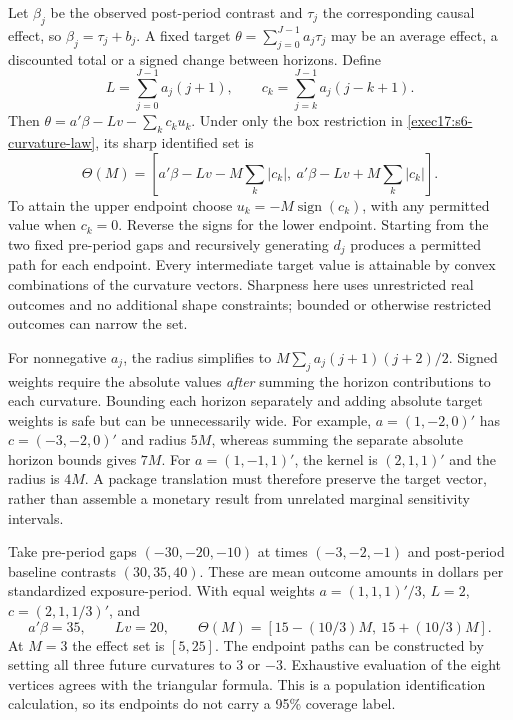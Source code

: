 Let $\beta_j$ be the observed post-period contrast and $\tau_j$ the
corresponding causal effect, so $\beta_j=\tau_j+b_j$. A fixed target
$\theta=\sum_{j=0}^{J-1}a_j\tau_j$ may be an average effect, a discounted
total or a signed change between horizons. Define
\begin{equation}
 L=\sum_{j=0}^{J-1}a_j(j+1),\qquad
 c_k=\sum_{j=k}^{J-1}a_j(j-k+1).
 \label{exec17:s6-target-kernel}
\end{equation}
Then $\theta=a'\beta-Lv-\sum_k c_ku_k$. Under only the box
restriction in \eqref{exec17:s6-curvature-law}, its sharp identified set is
\begin{equation}
 \Theta(M)=
 \left[a'\beta-Lv-M\sum_k|c_k|,
       \ a'\beta-Lv+M\sum_k|c_k|\right].
 \label{exec17:s6-sharp-curvature}
\end{equation}
To attain the upper endpoint choose
$u_k=-M\operatorname{sign}(c_k)$, with any permitted value when
$c_k=0$. Reverse the signs for the lower endpoint. Starting from the
two fixed pre-period gaps and recursively generating $d_j$ produces a
permitted path for each endpoint. Every intermediate target value is
attainable by convex combinations of the curvature vectors. Sharpness here
uses unrestricted real outcomes and no additional shape constraints; bounded
or otherwise restricted outcomes can narrow the set.

For nonnegative $a_j$, the radius simplifies to
$M\sum_j a_j(j+1)(j+2)/2$. Signed weights require the absolute values
\emph{after} summing the horizon contributions to each curvature. Bounding
each horizon separately and adding absolute target weights is safe but can
be unnecessarily wide. For example, $a=(1,-2,0)'$ has
$c=(-3,-2,0)'$ and radius $5M$, whereas summing the separate absolute
horizon bounds gives $7M$. For $a=(1,-1,1)'$, the kernel is
$(2,1,1)'$ and the radius is $4M$. A package translation must therefore
preserve the target vector, rather than assemble a monetary result from
unrelated marginal sensitivity intervals.

Take pre-period gaps $(-30,-20,-10)$ at times $(-3,-2,-1)$ and
post-period baseline contrasts $(30,35,40)$. These are mean outcome
amounts in dollars per standardized exposure-period. With equal weights
$a=(1,1,1)'/3$, $L=2$, $c=(2,1,1/3)'$, and
\begin{equation}
 a'\beta=35,\qquad Lv=20,\qquad
 \Theta(M)=[15-(10/3)M,\ 15+(10/3)M].
 \label{exec17:s6-money-sensitivity}
\end{equation}
At $M=3$ the effect set is $[5,25]$. The endpoint paths can be
constructed by setting all three future curvatures to $3$ or $-3$.
Exhaustive evaluation of the eight vertices agrees with the triangular
formula. This is a population identification calculation, so its endpoints
do not carry a 95\% coverage label.\citep{exec17_s6_math}


